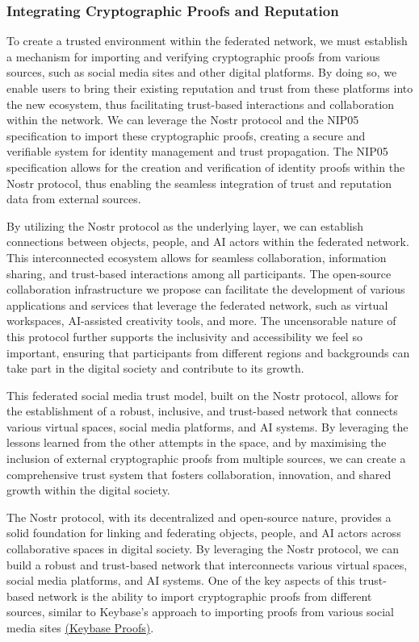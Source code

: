 \subsubsection{Integrating Cryptographic Proofs and Reputation}
To create a trusted environment within the federated network, we must establish a mechanism for importing and verifying cryptographic proofs from various sources, such as social media sites and other digital platforms. By doing so, we enable users to bring their existing reputation and trust from these platforms into the new ecosystem, thus facilitating trust-based interactions and collaboration within the network. We can leverage the Nostr protocol and the NIP05 specification to import these cryptographic proofs, creating a secure and verifiable system for identity management and trust propagation. The NIP05 specification allows for the creation and verification of identity proofs within the Nostr protocol, thus enabling the seamless integration of trust and reputation data from external sources.\par
By utilizing the Nostr protocol as the underlying layer, we can establish connections between objects, people, and AI actors within the federated network. This interconnected ecosystem allows for seamless collaboration, information sharing, and trust-based interactions among all participants. The open-source collaboration infrastructure we propose can facilitate the development of various applications and services that leverage the federated network, such as virtual workspaces, AI-assisted creativity tools, and more. The uncensorable nature of this protocol further supports the inclusivity and accessibility we feel so important, ensuring that participants from different regions and backgrounds can take part in the digital society and contribute to its growth.\par
This federated social media trust model, built on the Nostr protocol, allows for the establishment of a robust, inclusive, and trust-based network that connects various virtual spaces, social media platforms, and AI systems. By leveraging the lessons learned from the other attempts in the space, and by maximising the inclusion of external cryptographic proofs from multiple sources, we can create a comprehensive trust system that fosters collaboration, innovation, and shared growth within the digital society.

The Nostr protocol, with its decentralized and open-source nature, provides a solid foundation for linking and federating objects, people, and AI actors across collaborative spaces in digital society. By leveraging the Nostr protocol, we can build a robust and trust-based network that interconnects various virtual spaces, social media platforms, and AI systems. One of the key aspects of this trust-based network is the ability to import cryptographic proofs from different sources, similar to Keybase's approach to importing proofs from various social media sites \href{https://book.keybase.io/account#proofs}{(Keybase Proofs)}.

